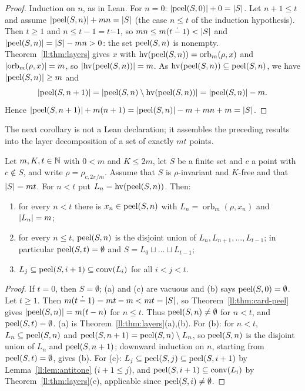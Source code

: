\begin{proof}
Induction on $n$, as in Lean. For $n=0$: $\lvert\operatorname{peel}(S,0)\rvert+0=\lvert S\rvert$. Let $n+1\le t$ and assume
$\lvert\operatorname{peel}(S,n)\rvert+mn=\lvert S\rvert$ (the case $n\le t$ of the induction hypothesis). Then $t\ge1$ and
$n\le t-1=t\mathbin{\dot{-}}1$, so $mn\le m(t\mathbin{\dot{-}}1)<\lvert S\rvert$ and $\lvert\operatorname{peel}(S,n)\rvert=\lvert S\rvert-mn>0$: the set
$\operatorname{peel}(S,n)$ is nonempty. Theorem~\ref{ll:thm:layers} gives $x$ with $\operatorname{hv}(\operatorname{peel}(S,n))=\operatorname{orb}_m(\rho,x)$ and
$\lvert\operatorname{orb}_m(\rho,x)\rvert=m$, so $\lvert\operatorname{hv}(\operatorname{peel}(S,n))\rvert=m$. As $\operatorname{hv}(\operatorname{peel}(S,n))\subseteq\operatorname{peel}(S,n)$, we have
$\lvert\operatorname{peel}(S,n)\rvert\ge m$ and
\[\lvert\operatorname{peel}(S,n+1)\rvert=\lvert\operatorname{peel}(S,n)\setminus\operatorname{hv}(\operatorname{peel}(S,n))\rvert=\lvert\operatorname{peel}(S,n)\rvert-m .\]
Hence $\lvert\operatorname{peel}(S,n+1)\rvert+m(n+1)=\lvert\operatorname{peel}(S,n)\rvert-m+mn+m=\lvert S\rvert$.
\end{proof}

The next corollary is not a Lean declaration; it assembles the preceding results into the layer decomposition of a set
of exactly $mt$ points.

\begin{corollary}\label{ll:cor:decomp}
Let $m,K,t\in\mathbb N$ with $0<m$ and $K\le2m$, let $S$ be a finite set and $c$ a point with $c\notin S$, and write
$\rho=\rho_{c,2\pi/m}$. Assume that $S$ is $\rho$-invariant and $K$-free and that $\lvert S\rvert=mt$. For $n<t$ put
$L_n=\operatorname{hv}(\operatorname{peel}(S,n))$. Then:
\begin{enumerate}[label=(\alph*)]
\item for every $n<t$ there is $x_n\in\operatorname{peel}(S,n)$ with $L_n=\operatorname{orb}_m(\rho,x_n)$ and $\lvert L_n\rvert=m$;
\item for every $n\le t$, $\operatorname{peel}(S,n)$ is the disjoint union of $L_n,L_{n+1},\dots,L_{t-1}$; in particular
  $\operatorname{peel}(S,t)=\emptyset$ and $S=L_0\sqcup\dots\sqcup L_{t-1}$;
\item $L_j\subseteq\operatorname{peel}(S,i+1)\subseteq\operatorname{conv}(L_i)$ for all $i<j<t$.
\end{enumerate}
\end{corollary}

\begin{proof}
If $t=0$, then $S=\emptyset$; (a) and (c) are vacuous and (b) says $\operatorname{peel}(S,0)=\emptyset$. Let $t\ge1$. Then
$m(t\mathbin{\dot{-}}1)=mt-m<mt=\lvert S\rvert$, so Theorem~\ref{ll:thm:card-peel} gives $\lvert\operatorname{peel}(S,n)\rvert=m(t-n)$ for $n\le t$.
Thus $\operatorname{peel}(S,n)\ne\emptyset$ for $n<t$, and $\operatorname{peel}(S,t)=\emptyset$. (a) is Theorem~\ref{ll:thm:layers}(a),(b). For
(b): for $n<t$, $L_n\subseteq\operatorname{peel}(S,n)$ and $\operatorname{peel}(S,n+1)=\operatorname{peel}(S,n)\setminus L_n$, so $\operatorname{peel}(S,n)$ is the disjoint
union of $L_n$ and $\operatorname{peel}(S,n+1)$; downward induction on $n$, starting from $\operatorname{peel}(S,t)=\emptyset$, gives (b). For (c):
$L_j\subseteq\operatorname{peel}(S,j)\subseteq\operatorname{peel}(S,i+1)$ by Lemma~\ref{ll:lem:antitone} ($i+1\le j$), and
$\operatorname{peel}(S,i+1)\subseteq\operatorname{conv}(L_i)$ by Theorem~\ref{ll:thm:layers}(c), applicable since $\operatorname{peel}(S,i)\ne\emptyset$.
\end{proof}

